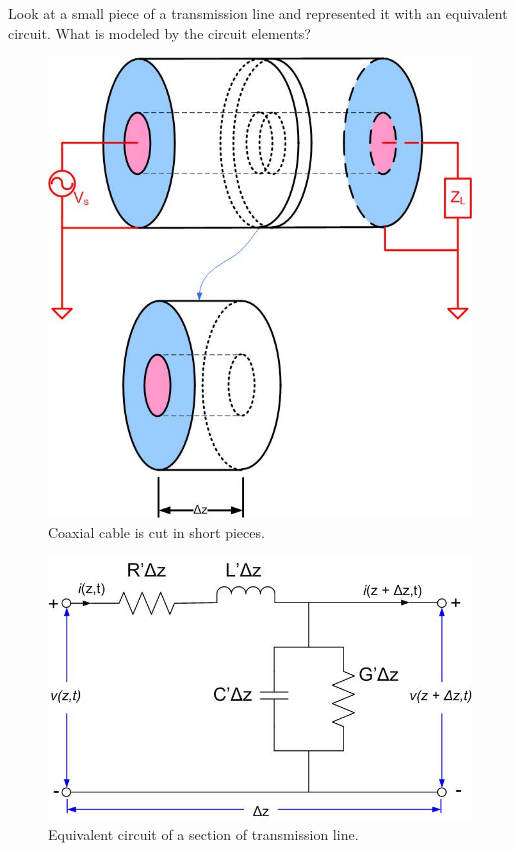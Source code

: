 \documentclass{ximera}
\begin{document}
Look at a small piece of a transmission line and represented it with an equivalent circuit. What is
modeled by the circuit elements?



\begin{figure}[htbp]
\begin{center}
\includegraphics[scale=0.3]{../jpg/Coaxtl.jpg}
\caption{Coaxial cable is cut in short pieces.}
\label{lineeqcPieces}
\end{center}
\end{figure}

\begin{figure}[htbp]
\begin{center}
\includegraphics[scale=0.3]{../jpg/Equivalent_Circuit_of_Transmission_Line.jpg}
\caption{Equivalent circuit of a section of transmission line.}
\label{lineeqcOnePiece}
\end{center}
\end{figure}
\end{document}

